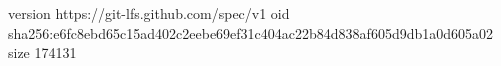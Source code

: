 version https://git-lfs.github.com/spec/v1
oid sha256:e6fc8ebd65c15ad402c2eebe69ef31c404ac22b84d838af605d9db1a0d605a02
size 174131
